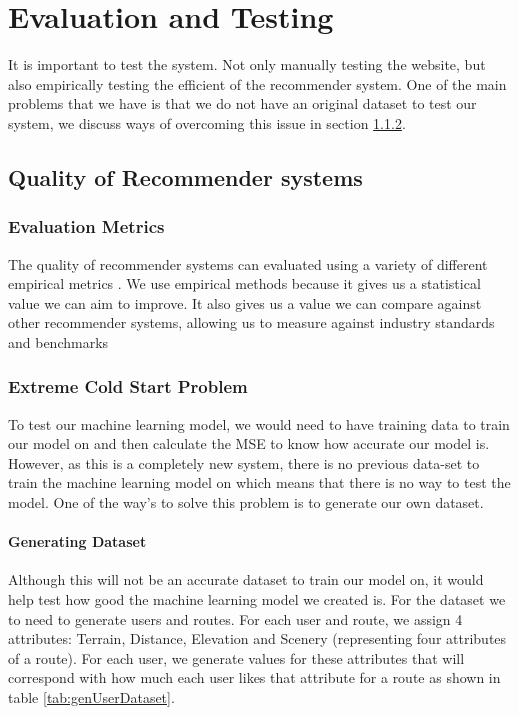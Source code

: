 \chapter{Evaluation and Testing}
It is important to test the system. Not only manually testing the website, but also empirically testing the efficient of the recommender system. One of the main problems that we have is that we do not have an original dataset to test our system, we discuss ways of overcoming this issue in section \ref{coldStartProble}.
\section{Quality of Recommender systems}
\subsection{Evaluation Metrics}
The quality of recommender systems can evaluated using a variety of different empirical metrics \cite{isinkaye2015recommendation}. We use empirical methods because it gives us a statistical value we can aim to improve. It also gives us a value we can compare against other recommender systems, allowing us to measure against industry standards and benchmarks
\subsection{Extreme Cold Start Problem} \label{coldStartProble}
To test our machine learning model, we would need to have training data to train our model on and then calculate the MSE to know how accurate our model is. However, as this is a completely new system, there is no previous data-set to train the machine learning model on which means that there is no way to test the model. One of the way's to solve this problem is to generate our own dataset.

\subsubsection{Generating Dataset}
Although this will not be an accurate dataset to train our model on, it would help test how good the machine learning model we created is. For the dataset we to need to generate users and routes. For each user and route, we assign 4 attributes: Terrain, Distance, Elevation and Scenery (representing four attributes of a route). For each user, we generate values for these attributes that will correspond with how much each user likes that attribute for a route as shown in table \ref{tab:genUserDataset}. 

